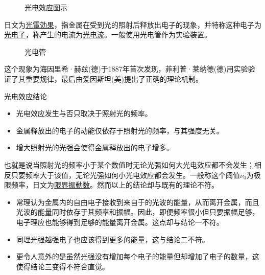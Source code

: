 \begin{figure}[ht!]
    \centering
    \caption{光电效应图示}
\end{figure}
日文为\underline{光電効果}，指金属在受到光的照射后释放出电子的现象，并特称这种电子为\underline{光电子}，称产生的电流为\underline{光电流}。一般使用光电管作为实验装置。
\begin{figure}[ht!]
    \centering
    \caption{光电管}
\end{figure}
这个现象为海因里希·赫兹(德)于1887年首次发现，菲利普·莱纳德(德)用实验验证了其重要规律，最后由爱因斯坦(美)提出了正确的理论机制。
\begin{itembox}[l]{光电效应结论}
    \begin{itemize}
        \item 光电效应发生与否只取决于照射光的频率。
        \item 金属释放出的电子的动能仅依存于照射光的频率，与其强度无关。
        \item 增大照射光的光强会使得金属释放出的电子增多。
    \end{itemize}
\end{itembox}
也就是说当照射光的频率小于某个数值时无论光强如何大光电效应都不会发生；相反只要频率大于该值，无论光强如何小光电效应都会发生。一般称这个阈值$\nu_0$为极限频率，日文为\underline{限界振動数}。然而以上的结论却与既有的理论不符。
\begin{itemize}
    \item 常理认为金属内的自由电子接收到来自于的光波的能量，从而离开金属，而且光波的能量同时依存于其频率和振幅。因此，即便频率很小但只要振幅足够，电子理应也能够得到足够的能量离开金属。这点却与结论一不符。
    \item 同理光强越强电子也应该得到更多的能量，这与结论二不符。
    \item 更令人意外的是虽然光强没有增加每个电子的能量但却增加了电子的数量，这使得结论三变得不符合直觉。
\end{itemize}

